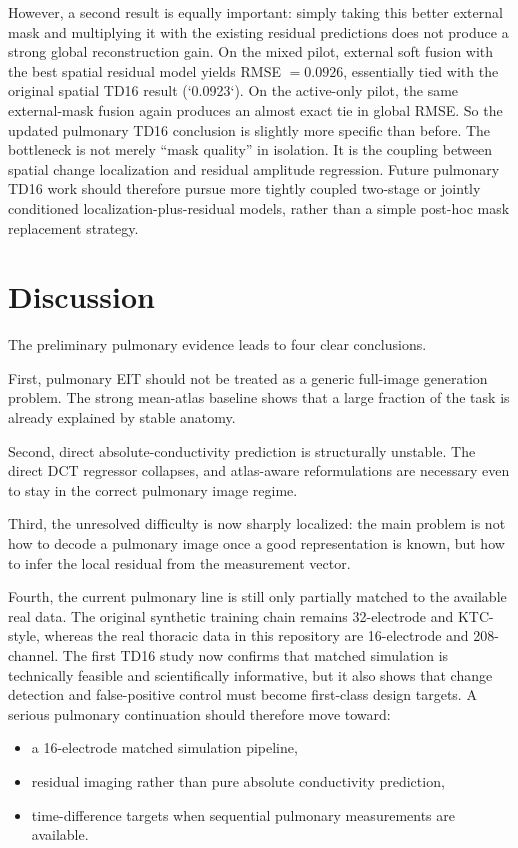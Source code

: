 \documentclass[11pt,a4paper]{article}
\begin{document}
However, a second result is equally important: simply taking this better
external mask and multiplying it with the existing residual predictions does not
produce a strong global reconstruction gain. On the mixed pilot, external soft
fusion with the best spatial residual model yields RMSE $= 0.0926$, essentially
tied with the original spatial TD16 result (`0.0923`). On the active-only
pilot, the same external-mask fusion again produces an almost exact tie in
global RMSE. So the updated pulmonary TD16 conclusion is slightly more specific
than before. The bottleneck is not merely ``mask quality'' in isolation. It is
the coupling between spatial change localization and residual amplitude
regression. Future pulmonary TD16 work should therefore pursue more tightly
coupled two-stage or jointly conditioned localization-plus-residual models,
rather than a simple post-hoc mask replacement strategy.

\section{Discussion}
The preliminary pulmonary evidence leads to four clear conclusions.

First, pulmonary EIT should not be treated as a generic full-image generation problem. The strong mean-atlas baseline shows that a large fraction of the task is already explained by stable anatomy.

Second, direct absolute-conductivity prediction is structurally unstable. The direct DCT regressor collapses, and atlas-aware reformulations are necessary even to stay in the correct pulmonary image regime.

Third, the unresolved difficulty is now sharply localized: the main problem is not how to decode a pulmonary image once a good representation is known, but how to infer the local residual from the measurement vector.

Fourth, the current pulmonary line is still only partially matched to the available real data. The original synthetic training chain remains 32-electrode and KTC-style, whereas the real thoracic data in this repository are 16-electrode and 208-channel. The first TD16 study now confirms that matched simulation is technically feasible and scientifically informative, but it also shows that change detection and false-positive control must become first-class design targets. A serious pulmonary continuation should therefore move toward:
\begin{itemize}[leftmargin=1.5em]
    \item a 16-electrode matched simulation pipeline,
    \item residual imaging rather than pure absolute conductivity prediction,
    \item time-difference targets when sequential pulmonary measurements are available.
\end{itemize}
\end{document}
